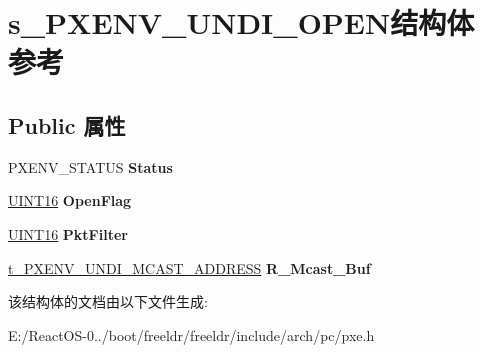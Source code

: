 \hypertarget{structs___p_x_e_n_v___u_n_d_i___o_p_e_n}{}\section{s\+\_\+\+P\+X\+E\+N\+V\+\_\+\+U\+N\+D\+I\+\_\+\+O\+P\+E\+N结构体 参考}
\label{structs___p_x_e_n_v___u_n_d_i___o_p_e_n}
\subsection*{Public 属性}
\begin{DoxyCompactItemize}
\item 
\mbox{\label{structs___p_x_e_n_v___u_n_d_i___o_p_e_n_a832966b1ed4003df3bcbd43be5fed0fd}} 
P\+X\+E\+N\+V\+\_\+\+S\+T\+A\+T\+US {\bfseries Status}
\item 
\mbox{\label{structs___p_x_e_n_v___u_n_d_i___o_p_e_n_a0a52c04f261739161f120022382ed3ce}} 
\hyperlink{_processor_bind_8h_a09f1a1fb2293e33483cc8d44aefb1eb1}{U\+I\+N\+T16} {\bfseries Open\+Flag}
\item 
\mbox{\label{structs___p_x_e_n_v___u_n_d_i___o_p_e_n_a4377a465d4db355ded166b2fa85c60bb}} 
\hyperlink{_processor_bind_8h_a09f1a1fb2293e33483cc8d44aefb1eb1}{U\+I\+N\+T16} {\bfseries Pkt\+Filter}
\item 
\mbox{\label{structs___p_x_e_n_v___u_n_d_i___o_p_e_n_a4da6029228b964db973d5401d8673085}} 
\hyperlink{structs___p_x_e_n_v___u_n_d_i___m_c_a_s_t___a_d_d_r_e_s_s}{t\+\_\+\+P\+X\+E\+N\+V\+\_\+\+U\+N\+D\+I\+\_\+\+M\+C\+A\+S\+T\+\_\+\+A\+D\+D\+R\+E\+SS} {\bfseries R\+\_\+\+Mcast\+\_\+\+Buf}
\end{DoxyCompactItemize}


该结构体的文档由以下文件生成\+:\begin{DoxyCompactItemize}
\item 
E\+:/\+React\+O\+S-\/0../boot/freeldr/freeldr/include/arch/pc/pxe.\+h\end{DoxyCompactItemize}
